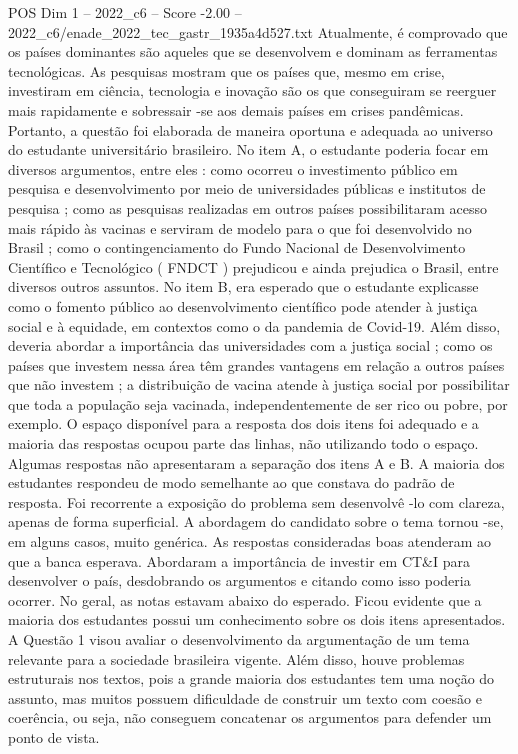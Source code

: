 \begin{textsample}{POS Dim 1 – 2022\_c6 – Score -2.00 – 2022\_c6/enade\_2022\_tec\_gastr\_1935a4d527.txt}
Atualmente, é comprovado que os países dominantes são aqueles que se desenvolvem e dominam as ferramentas tecnológicas.
As pesquisas mostram que os países que, mesmo em crise, investiram em ciência, tecnologia e inovação são os que conseguiram se reerguer mais rapidamente e sobressair -se aos demais países em crises pandêmicas.
Portanto, a questão foi elaborada de maneira oportuna e adequada ao universo do estudante universitário brasileiro.
No item A, o estudante poderia focar em diversos argumentos, entre eles : como ocorreu o investimento público em pesquisa e desenvolvimento por meio de universidades públicas e institutos de pesquisa ; como as pesquisas realizadas em outros países possibilitaram acesso mais rápido às vacinas e serviram de modelo para o que foi desenvolvido no Brasil ; como o contingenciamento do Fundo Nacional de Desenvolvimento Científico e Tecnológico ( FNDCT ) prejudicou e ainda prejudica o Brasil, entre diversos outros assuntos.
No item B, era esperado que o estudante explicasse como o fomento público ao desenvolvimento científico pode atender à justiça social e à equidade, em contextos como o da pandemia de Covid-19.
Além disso, deveria abordar a importância das universidades com a justiça social ; como os países que investem nessa área têm grandes vantagens em relação a outros países que não investem ; a distribuição de vacina atende à justiça social por possibilitar que toda a população seja vacinada, independentemente de ser rico ou pobre, por exemplo.
O espaço disponível para a resposta dos dois itens foi adequado e a maioria das respostas ocupou parte das linhas, não utilizando todo o espaço.
Algumas respostas não apresentaram a separação dos itens A e B.
A maioria dos estudantes respondeu de modo semelhante ao que constava do padrão de resposta.
Foi recorrente a exposição do problema sem desenvolvê -lo com clareza, apenas de forma superficial.
A abordagem do candidato sobre o tema tornou -se, em alguns casos, muito genérica.
As respostas consideradas boas atenderam ao que a banca esperava.
Abordaram a importância de investir em CT\&I para desenvolver o país, desdobrando os argumentos e citando como isso poderia ocorrer.
No geral, as notas estavam abaixo do esperado.
Ficou evidente que a maioria dos estudantes possui um conhecimento sobre os dois itens apresentados.
A Questão 1 visou avaliar o desenvolvimento da argumentação de um tema relevante para a sociedade brasileira vigente.
Além disso, houve problemas estruturais nos textos, pois a grande maioria dos estudantes tem uma noção do assunto, mas muitos possuem dificuldade de construir um texto com coesão e coerência, ou seja, não conseguem concatenar os argumentos para defender um ponto de vista.

\end{textsample}
